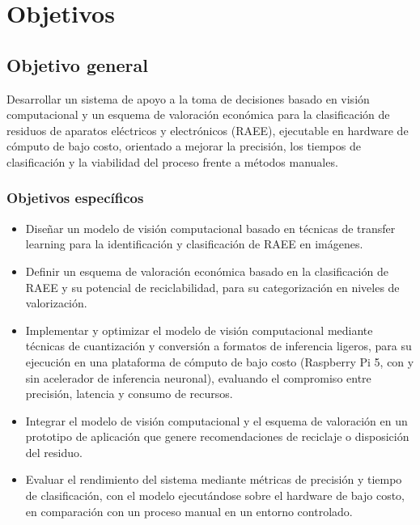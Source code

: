 \chapter{Objetivos}

\section{Objetivo general}
Desarrollar un sistema de apoyo a la toma de decisiones basado en visión computacional y un esquema de valoración económica para la clasificación de residuos de aparatos eléctricos y electrónicos (RAEE), ejecutable en hardware de cómputo de bajo costo, orientado a mejorar la precisión, los tiempos de clasificación y la viabilidad del proceso frente a métodos manuales.

\subsection{Objetivos específicos}
\begin{itemize}
    \item Diseñar un modelo de visión computacional basado en técnicas de transfer learning para la identificación y clasificación de RAEE en imágenes.
    \item Definir un esquema de valoración económica basado en la clasificación de RAEE y su potencial de reciclabilidad, para su categorización en niveles de valorización.
    \item Implementar y optimizar el modelo de visión computacional mediante técnicas de cuantización y conversión a formatos de inferencia ligeros, para su ejecución en una plataforma de cómputo de bajo costo (Raspberry Pi 5, con y sin acelerador de inferencia neuronal), evaluando el compromiso entre precisión, latencia y consumo de recursos.
    \item Integrar el modelo de visión computacional y el esquema de valoración en un prototipo de aplicación que genere recomendaciones de reciclaje o disposición del residuo.
    \item Evaluar el rendimiento del sistema mediante métricas de precisión y tiempo de clasificación, con el modelo ejecutándose sobre el hardware de bajo costo, en comparación con un proceso manual en un entorno controlado.
\end{itemize}
